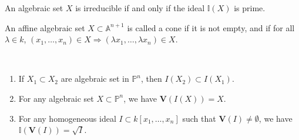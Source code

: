                 \begin{theorem}
                    An algebraic set $X$ is irreducible
                    if and only if the ideal $\mathbb{I}(X)$ is prime.
                \end{theorem}
                \begin{definition}
                    An affine algebraic set $X\subset \mathbb{A}^{n+1}$
                    is called a cone if it is not empty, and if for all
                    $\lambda\in{k}$,
                    $(x_1,\hdots, x_n)%
                     \in{X}\Rightarrow(\lambda{x_{1}},\hdots,\lambda{x_{n}})%
                     \in{X}$.
                \end{definition}
                \begin{theorem}
                    \
                    \begin{enumerate}
                        \item If $X_1\subset X_2$ are algebraic
                              set in $\mathbb{P}^{n}$,
                              then $I(X_{2})\subset{I}(X_{1})$.
                        \item For any algebraic set
                              $X\subset\mathbb{P}^{n}$, we have
                              $\mathbf{V}(I(X))=X$.
                        \item For any homogeneous ideal
                              $I\subset{k}[x_{1},\hdots,x_{n}]$ such
                              that $\mathbf{V}(I)\ne\emptyset$,
                              we have
                              $\mathbb{I}(\mathbf{V}(I))=\sqrt{I}$.
                    \end{enumerate}
                \end{theorem}